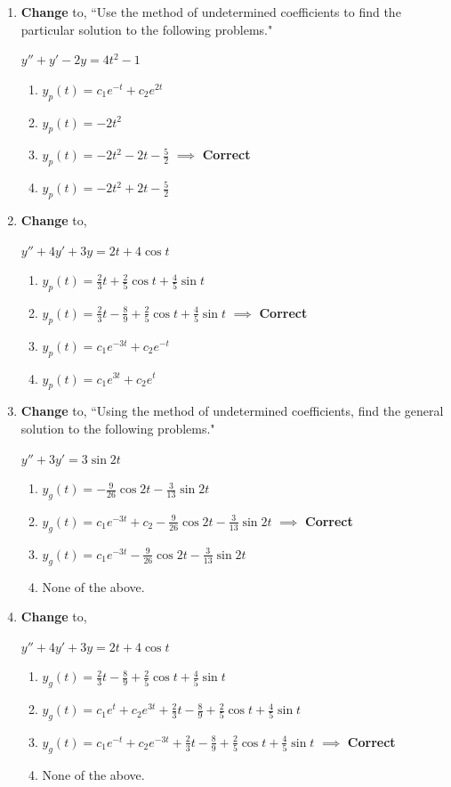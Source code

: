 \documentclass[fleqn]{article}[11pt]
\begin{document}
\begin{enumerate}
	\item \textbf{Change} to, ``Use the method of undetermined coefficients to find the particular solution to the following problems."
	
		\(y''+y'-2y=4t^2-1\)
			\begin{enumerate}
				\item $y_{p}(t)=c_{1}e^{-t}+c_{2}e^{2t}$
				\item $y_{p}(t)=-2t^2$
				\item $y_{p}(t)=-2t^2-2t-\frac{5}{2}$ $\implies$ \textbf{Correct}
				\item $y_{p}(t)=-2t^2+2t-\frac{5}{2}$
			\end{enumerate}
	
	\item \textbf{Change} to, 
	
		\(y''+4y'+3y=2t+4\cos{t}\)
			\begin{enumerate}
				\item $y_{p}(t)=\frac{2}{3}t+\frac{2}{5}\cos{t}+\frac{4}{5}\sin{t}$
				\item $y_{p}(t)=\frac{2}{3}t-\frac{8}{9}+\frac{2}{5}\cos{t}+\frac{4}{5}\sin{t}$ $\implies$ \textbf{Correct}
				\item $y_{p}(t)=c_{1}e^{-3t}+c_{2}e^{-t}$
				\item $y_{p}(t)=c_{1}e^{3t}+c_{2}e^{t}$
			\end{enumerate}
	
	\item \textbf{Change} to, ``Using the method of undetermined coefficients, find the general solution to the following problems."
	
		\(y''+3y'=3\sin{2t}\)
			\begin{enumerate}
				\item $y_{g}(t)=-\frac{9}{26}\cos{2t}-\frac{3}{13}\sin{2t}$
				\item $y_{g}(t)=c_{1}e^{-3t}+c_{2}-\frac{9}{26}\cos{2t}-\frac{3}{13}\sin{2t}$ $\implies$ \textbf{Correct}
				\item $y_{g}(t)=c_{1}e^{-3t}-\frac{9}{26}\cos{2t}-\frac{3}{13}\sin{2t}$
				\item None of the above.
			\end{enumerate}
	\item \textbf{Change} to,
	
		\(y''+4y'+3y=2t+4\cos{t}\)
			\begin{enumerate}
				\item $y_{g}(t)=\frac{2}{3}t-\frac{8}{9}+\frac{2}{5}\cos{t}+\frac{4}{5}\sin{t}$
				\item $y_{g}(t)=c_{1}e^{t}+c_{2}e^{3t}+\frac{2}{3}t-\frac{8}{9}+\frac{2}{5}\cos{t}+\frac{4}{5}\sin{t}$
				\item $y_{g}(t)=c_{1}e^{-t}+c_{2}e^{-3t}+\frac{2}{3}t-\frac{8}{9}+\frac{2}{5}\cos{t}+\frac{4}{5}\sin{t}$ $\implies$ \textbf{Correct}
				\item None of the above.
			\end{enumerate}


\end{enumerate}
\end{document}
